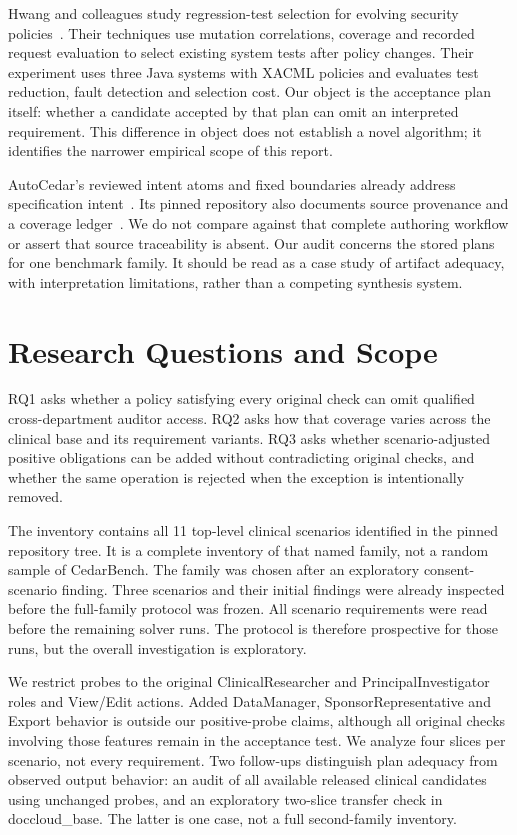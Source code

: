 \documentclass[sigconf,nonacm]{acmart}
\begin{document}
Hwang and colleagues study regression-test selection for evolving security policies~\cite{hwang}. Their techniques use mutation correlations, coverage and recorded request evaluation to select existing system tests after policy changes. Their experiment uses three Java systems with XACML policies and evaluates test reduction, fault detection and selection cost. Our object is the acceptance plan itself: whether a candidate accepted by that plan can omit an interpreted requirement. This difference in object does not establish a novel algorithm; it identifies the narrower empirical scope of this report.

AutoCedar's reviewed intent atoms and fixed boundaries already address specification intent~\cite{autocedar}. Its pinned repository also documents source provenance and a coverage ledger~\cite{artifact}. We do not compare against that complete authoring workflow or assert that source traceability is absent. Our audit concerns the stored plans for one benchmark family. It should be read as a case study of artifact adequacy, with interpretation limitations, rather than a competing synthesis system.

\section{Research Questions and Scope}
RQ1 asks whether a policy satisfying every original check can omit qualified cross-department auditor access. RQ2 asks how that coverage varies across the clinical base and its requirement variants. RQ3 asks whether scenario-adjusted positive obligations can be added without contradicting original checks, and whether the same operation is rejected when the exception is intentionally removed.

The inventory contains all 11 top-level clinical scenarios identified in the pinned repository tree. It is a complete inventory of that named family, not a random sample of CedarBench. The family was chosen after an exploratory consent-scenario finding. Three scenarios and their initial findings were already inspected before the full-family protocol was frozen. All scenario requirements were read before the remaining solver runs. The protocol is therefore prospective for those runs, but the overall investigation is exploratory.

We restrict probes to the original ClinicalResearcher and PrincipalInvestigator roles and View/Edit actions. Added DataManager, SponsorRepresentative and Export behavior is outside our positive-probe claims, although all original checks involving those features remain in the acceptance test. We analyze four slices per scenario, not every requirement. Two follow-ups distinguish plan adequacy from observed output behavior: an audit of all available released clinical candidates using unchanged probes, and an exploratory two-slice transfer check in doccloud\_base. The latter is one case, not a full second-family inventory.
\end{document}
